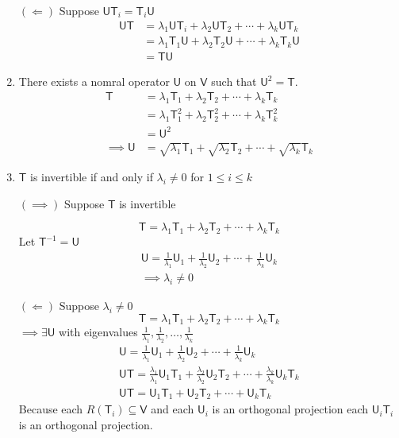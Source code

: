\begin{enumerate}
$(\Leftarrow)$ Suppose $\mathsf{U}\mathsf{T}_i = \mathsf{T}_i\mathsf{U}$
\begin{align}
\mathsf{U}\mathsf{T} &= \lambda_1\mathsf{U}\mathsf{T}_i +
\lambda_2\mathsf{U}\mathsf{T}_2 + \dotsb +
\lambda_k\mathsf{U}\mathsf{T}_k\\
&= \lambda_1\mathsf{T}_1\mathsf{U} + \lambda_2\mathsf{T}_2\mathsf{U} +
\dotsb + \lambda_k\mathsf{T}_k\mathsf{U}\\
&= \mathsf{T}\mathsf{U}
\end{align}

\item There exists a nomral operator $\mathsf{U}$ on $\mathsf{V}$ such
  that $\mathsf{U}^2 = \mathsf{T}.$
\begin{align}
\mathsf{T} &= \lambda_1\mathsf{T}_1 + \lambda_2\mathsf{T}_2 + \dotsb +
\lambda_k\mathsf{T}_k\\
&= \lambda_1\mathsf{T}^2_1 + \lambda_2\mathsf{T}_2^2 + \dotsb +
\lambda_k\mathsf{T}_k^2\\
&= \mathsf{U}^2\\
\implies \mathsf{U} &= \sqrt{\lambda_1}\mathsf{T}_1 +
\sqrt{\lambda_2}\mathsf{T}_2 + \dotsb + \sqrt{\lambda_k}\mathsf{T}_k
\end{align}

\item $\mathsf{T}$ is invertible if and only if $\lambda_i \neq 0$ for
  $1 \leq i \leq k$

$(\implies)$ Suppose $\mathsf{T}$ is invertible

\begin{equation}
\mathsf{T} = \lambda_1\mathsf{T}_1 + \lambda_2\mathsf{T}_2 + \dotsb + \lambda_k\mathsf{T}_k
\end{equation}
Let $\mathsf{T}^{-1} = \mathsf{U}$ 
\begin{gather}
\mathsf{U} = \frac{1}{\lambda_1}\mathsf{U}_1 +
\frac{1}{\lambda_2}\mathsf{U}_2 + \dotsb +
\frac{1}{\lambda_k}\mathsf{U}_k\\
\implies \lambda_i \neq 0
\end{gather}

$(\Leftarrow)$ Suppose $\lambda_i \neq 0$
\begin{equation}
\mathsf{T} = \lambda_1\mathsf{T}_1 + \lambda_2\mathsf{T}_2 + \dotsb + \lambda_k\mathsf{T}_k
\end{equation}
$\implies \exists \mathsf{U}$ with eigenvalues
$\frac{1}{\lambda_1},\frac{1}{\lambda_2},\dotsc,\frac{1}{\lambda_k}$ 
\begin{gather}
\mathsf{U} = \frac{1}{\lambda_1}\mathsf{U}_1 +
\frac{1}{\lambda_2}\mathsf{U}_2 + \dotsb +
\frac{1}{\lambda_k}\mathsf{U}_k\\
\mathsf{U}\mathsf{T} =
\frac{\lambda_1}{\lambda_1}\mathsf{U}_1\mathsf{T}_1 + 
\frac{\lambda_2}{\lambda_2}\mathsf{U}_2\mathsf{T}_2 + \dotsb +
\frac{\lambda_k}{\lambda_k}\mathsf{U}_k\mathsf{T}_k\\
\mathsf{U}\mathsf{T} = \mathsf{U}_1\mathsf{T}_1 +
\mathsf{U}_2\mathsf{T}_2 + \dotsb + \mathsf{U}_k\mathsf{T}_k
\end{gather}
Because each $R(\mathsf{T}_i) \subseteq \mathsf{V}$ and each
$\mathsf{U}_i$ is an orthogonal projection each
$\mathsf{U}_i\mathsf{T}_i$ is an orthogonal projection.


\end{enumerate}
